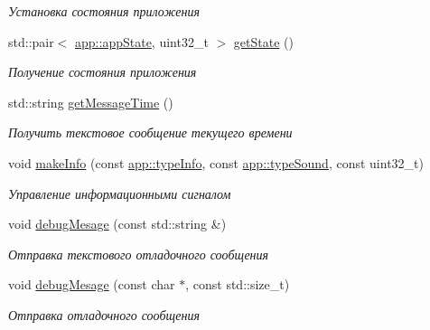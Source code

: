 \begin{DoxyCompactItemize}
\begin{DoxyCompactList}\small\item\em Установка состояния приложения \end{DoxyCompactList}\item 
std\+::pair$<$ \hyperlink{group___xD0_x9F_xD0_xB5_xD1_x80_xD0_xB5_xD1_x87_xD0_xB8_xD1_x81_xD0_xBB_xD0_xB5_xD0_xBD_xD0_xB8_xD1_x8F_ga290e8080c661e52c2f685fd4af148acf}{app\+::app\+State}, uint32\+\_\+t $>$ \hyperlink{classapp_1_1_t_application_a254728135b699d84f82a334708b1fbda}{get\+State} ()
\begin{DoxyCompactList}\small\item\em Получение состояния приложения \end{DoxyCompactList}\item 
std\+::string \hyperlink{classapp_1_1_t_application_aa2cb4a923a937f1a47a28fb5efe3b943}{get\+Message\+Time} ()
\begin{DoxyCompactList}\small\item\em Получить текстовое сообщение текущего времени \end{DoxyCompactList}\item 
void \hyperlink{classapp_1_1_t_application_ad6812ead3b88d21dc886d5e4d3bbfaab}{make\+Info} (const \hyperlink{group___xD0_x9F_xD0_xB5_xD1_x80_xD0_xB5_xD1_x87_xD0_xB8_xD1_x81_xD0_xBB_xD0_xB5_xD0_xBD_xD0_xB8_xD1_x8F_gaf2797b8ed91d66a25b1b3b05ea7bcfc2}{app\+::type\+Info}, const \hyperlink{group___xD0_x9F_xD0_xB5_xD1_x80_xD0_xB5_xD1_x87_xD0_xB8_xD1_x81_xD0_xBB_xD0_xB5_xD0_xBD_xD0_xB8_xD1_x8F_ga33d8f1a04a907b6c65c5dfc88280ac6f}{app\+::type\+Sound}, const uint32\+\_\+t)
\begin{DoxyCompactList}\small\item\em Управление информационными сигналом \end{DoxyCompactList}\item 
void \hyperlink{classapp_1_1_t_application_a2ac87a63360e7974afe2249f7b7e54cd}{debug\+Mesage} (const std\+::string \&)
\begin{DoxyCompactList}\small\item\em Отправка текстового отладочного сообщения \end{DoxyCompactList}\item 
void \hyperlink{classapp_1_1_t_application_a136a0f8acf017467e50018c00bad3d24}{debug\+Mesage} (const char $\ast$, const std\+::size\+\_\+t)
\begin{DoxyCompactList}\small\item\em Отправка отладочного сообщения \end{DoxyCompactList}\item 

\end{DoxyCompactItemize}
